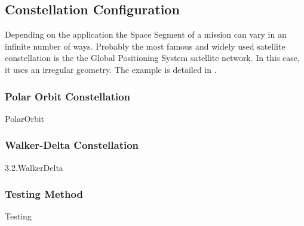 \subsection{Constellation Configuration}



Depending on the application the Space Segment of a mission can vary in an infinite number of ways. Probably the most famous and widely used satellite constellation is the the Global Positioning System satellite network. In this case, it uses an irregular geometry. The example is detailed in \cite[Chapter 3, Section 1]{annex1}.

\subsubsection{Polar Orbit Constellation}\label{PolarOrbit}
{PolarOrbit}

\subsubsection{Walker-Delta Constellation}
{3.2.WalkerDelta}

\subsubsection{Testing Method}\label{Testing}
{Testing}
